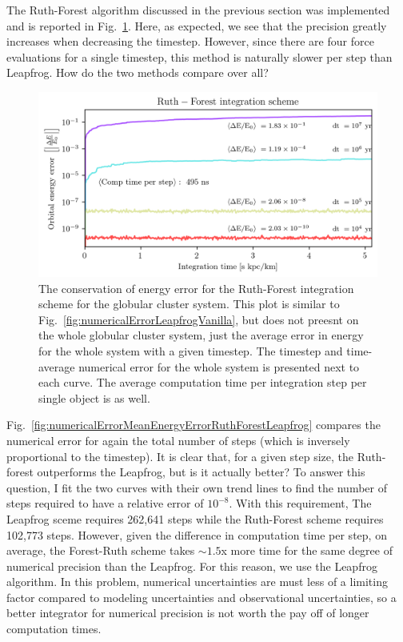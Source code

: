         The Ruth-Forest algorithm discussed in the previous section was implemented and is reported in Fig.~\ref{fig:numericalErrorRuthForest}. Here, as expected, we see that the precision greatly increases when decreasing the timestep. However, since there are four force evaluations for a single timestep, this method is naturally slower per step than Leapfrog. How do the two methods compare over all?
        \begin{figure}
            \centering
            \includegraphics[width=\linewidth]{images/numericalErrorRuthForest.png}
            \caption[Relative orbital energy using the Ruth-Forest scheme]{The conservation of energy error for the Ruth-Forest integration scheme for the globular cluster system. This plot is similar to Fig.~\ref{fig:numericalErrorLeapfrogVanilla}, but does not preesnt on the whole globular cluster system, just the average error in energy for the whole system with a given timestep. The timestep and time-average numerical error for the whole system is presented next to each curve. The average computation time per integration step per single object is as well.}
            \label{fig:numericalErrorRuthForest}
        \end{figure}
        Fig.~\ref{fig:numericalErrorMeanEnergyErrorRuthForestLeapfrog} compares the numerical error for again the total number of steps (which is inversely proportional to the timestep). It is clear that, for a given step size, the Ruth-forest outperforms the Leapfrog, but is it actually better? To answer this question, I fit the two curves with their own trend lines to find the number of steps required to have a relative error of $10^{-8}$. With this requirement, The Leapfrog sceme requires 262,641 steps while the Ruth-Forest scheme requires 102,773 steps. However, given the difference in computation time per step, on average, the Forest-Ruth scheme takes $\sim 1.5$x more time for the same degree of numerical precision than the Leapfrog. For this reason, we use the Leapfrog algorithm. In this problem, numerical uncertainties are must less of a limiting factor compared to modeling uncertainties and observational uncertainties, so a better integrator for numerical precision is not worth the pay off of longer computation times. 
